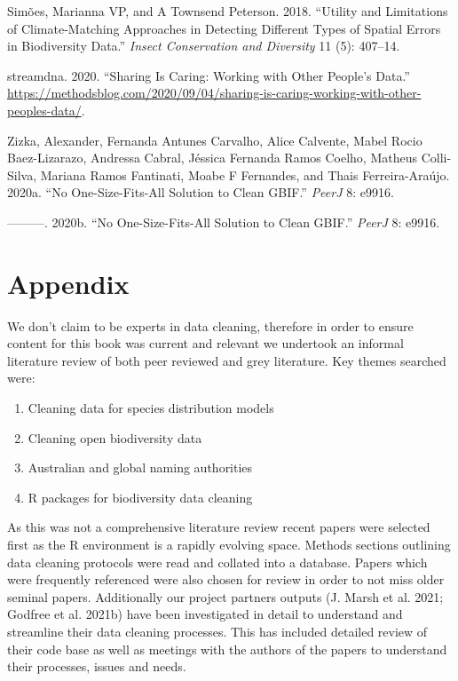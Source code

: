 \documentclass[
  letterpaper,
  DIV=11,
  numbers=noendperiod,
  oneside]{scrreprt}
\newlength{\cslhangindent}
\newlength{\cslentryspacingunit} %
\newenvironment{CSLReferences}[2] %
 {%
  \setlength{\parindent}{0pt}
  \ifodd #1
  \let\oldpar\par
  \def\par{\hangindent=\cslhangindent\oldpar}
  \fi
  \setlength{\parskip}{#2\cslentryspacingunit}
 }%
 {}
\begin{document}
\begin{CSLReferences}{1}{0}
\leavevmode{}%
Simões, Marianna VP, and A Townsend Peterson. 2018. {``Utility and
Limitations of Climate-Matching Approaches in Detecting Different Types
of Spatial Errors in Biodiversity Data.''} \emph{Insect Conservation and
Diversity} 11 (5): 407--14.

\leavevmode{}%
streamdna. 2020. {``Sharing Is {Caring}: {Working} with {Other} People's
{Data}.''}
\url{https://methodsblog.com/2020/09/04/sharing-is-caring-working-with-other-peoples-data/}.

\leavevmode{}%
Zizka, Alexander, Fernanda Antunes Carvalho, Alice Calvente, Mabel Rocio
Baez-Lizarazo, Andressa Cabral, Jéssica Fernanda Ramos Coelho, Matheus
Colli-Silva, Mariana Ramos Fantinati, Moabe F Fernandes, and Thais
Ferreira-Araújo. 2020a. {``No One-Size-Fits-All Solution to Clean
{GBIF}.''} \emph{PeerJ} 8: e9916.

\leavevmode{}%
---------. 2020b. {``No One-Size-Fits-All Solution to Clean GBIF.''}
\emph{PeerJ} 8: e9916.

\end{CSLReferences}


\hypertarget{sec-appendix}{%
\chapter{Appendix}\label{sec-appendix}}

We don't claim to be experts in data cleaning, therefore in order to
ensure content for this book was current and relevant we undertook an
informal literature review of both peer reviewed and grey literature.
Key themes searched were:

\begin{enumerate}
\def\labelenumi{\arabic{enumi}.}
\item
  Cleaning data for species distribution models
\item
  Cleaning open biodiversity data
\item
  Australian and global naming authorities
\item
  R packages for biodiversity data cleaning
\end{enumerate}

As this was not a comprehensive literature review recent papers were
selected first as the R environment is a rapidly evolving space. Methods
sections outlining data cleaning protocols were read and collated into a
database. Papers which were frequently referenced were also chosen for
review in order to not miss older seminal papers. Additionally our
project partners outputs (J. Marsh et al. 2021; Godfree et al. 2021b)
have been investigated in detail to understand and streamline their data
cleaning processes. This has included detailed review of their code base
as well as meetings with the authors of the papers to understand their
processes, issues and needs.
\end{document}
